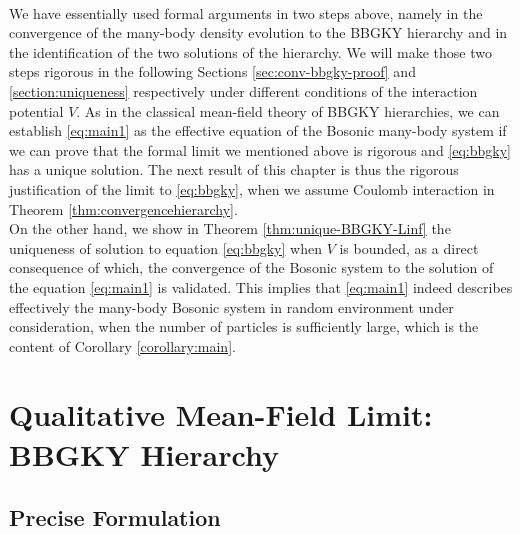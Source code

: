 \

We have essentially used formal arguments in two steps above, namely in the
convergence of the many-body density evolution to the BBGKY hierarchy and in
the identification of the two solutions of the hierarchy. We will make those two steps rigorous in the following Sections
\ref{sec:conv-bbgky-proof} and \ref{section:uniqueness} respectively under
different conditions of the interaction potential $V$. As in the classical mean-field theory of BBGKY hierarchies, we can establish
\eqref{eq:main1} as the effective equation of the Bosonic
many-body system if we can prove that the formal limit we mentioned above is
rigorous and \eqref{eq:bbgky} has a unique solution. The next result of
this chapter is thus the rigorous justification of the limit to
\eqref{eq:bbgky}, when we assume Coulomb interaction in Theorem
\ref{thm:convergencehierarchy}.\\

On the other hand, we show in Theorem \ref{thm:unique-BBGKY-Linf} the uniqueness of
solution to equation \eqref{eq:bbgky} when $V$ is bounded, as
a direct consequence of which, the convergence of the Bosonic system to the
solution of the equation \eqref{eq:main1} is validated. This implies that
\eqref{eq:main1} indeed describes effectively the many-body Bosonic system in
random environment under consideration, when the number of particles is
sufficiently large, which is the content of Corollary \ref{corollary:main}.

\section{Qualitative Mean-Field Limit: BBGKY Hierarchy}\label{chapter:MFL-MB}
\subsection{Precise Formulation}


